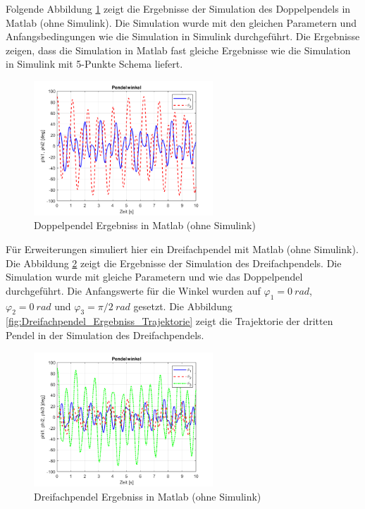 Folgende Abbildung \ref{fig:Doppelpendel_Ergebniss} zeigt die Ergebnisse der Simulation des Doppelpendels in Matlab (ohne Simulink). Die Simulation wurde mit den gleichen Parametern und Anfangsbedingungen wie die Simulation in Simulink durchgeführt. Die Ergebnisse zeigen, dass die Simulation in Matlab fast gleiche Ergebnisse wie die Simulation in Simulink mit 5-Punkte Schema liefert. 
\begin{figure}[H]
    \centering
    \includegraphics[width=0.6\textwidth]{figures/Doppelpendel_Ergebniss.png}
    \caption{Doppelpendel Ergebniss in Matlab (ohne Simulink)}
    \label{fig:Doppelpendel_Ergebniss}
\end{figure}

Für Erweiterungen simuliert hier ein Dreifachpendel mit Matlab (ohne Simulink). Die Abbildung \ref{fig:Dreifachpendel_Ergebniss} zeigt die Ergebnisse der Simulation des Dreifachpendels. Die Simulation wurde mit gleiche Parametern und wie das Doppelpendel durchgeführt. Die Anfangswerte für die Winkel wurden auf $\varphi_1 = 0~rad$, $\varphi_2 = 0~rad$ und $\varphi_3 = \pi/2~rad$ gesetzt. Die Abbildung \ref{fig:Dreifachpendel_Ergebniss_Trajektorie} zeigt die Trajektorie der dritten Pendel in der Simulation des Dreifachpendels.
\begin{figure}[H]
    \centering
    \includegraphics[width=0.6\textwidth]{figures/Dreifachpendel_Ergebniss.png}
    \caption{Dreifachpendel Ergebniss in Matlab (ohne Simulink)}
    \label{fig:Dreifachpendel_Ergebniss}
  \end{figure}

